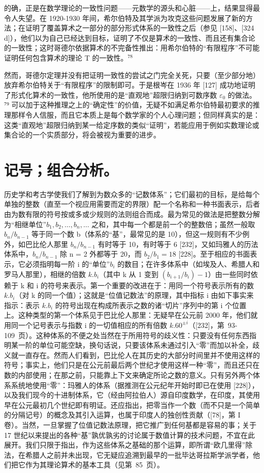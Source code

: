 的确，正是在数学理论的一致性问题——元数学的源头和心脏——上，结果显得最令人失望。在 1920-1930 年间，希尔伯特及其学派为攻克这些问题发展了新的方法；在证明了覆盖算术之一部分的部分形式体系的一致性之后（参见 {[}158{]}、{[}324 d{]}），他们以为自己已经达到目标，证明了不仅是算术的一致性、而且还有集合论的一致性；这时哥德尔依据算术的不完备性推出：用希尔伯特的“有限程序”不可能证明任何包含算术的理论 T 的一致性。\(^{78}\)

然而，哥德尔定理并没有把证明一致性的尝试之门完全关死，只要（至少部分地）放弃希尔伯特关于“有限程序”的限制即可。于是根岑在 1936 年 {[}127{]} 成功地证明了形式化算术的一致性，他所使用的是“直观地”超限归纳到可数序数 \(\varepsilon_{0}\) 的做法。⁷⁹ 可以加于这种推理之上的“确定性”的价值，无疑不如满足希尔伯特最初要求的推理那样令人信服，而且它本质上是每个数学家的个人心理问题；但同样真实的是：这类“直观地”超限归纳到某一给定序数的类似“证明”，若能应用于例如实数理论或集合论的一个实质部分，将会被视为重要的进步。

\chapter{记号；组合分析。}

历史学和考古学使我们了解到为数众多的“记数体系”；它们最初的目标，是给每个单独的整数（直至一个视应用需要而定的界限）配一个名称和一种书面表示，后者由为数有限的符号按或多或少规则的法则组合而成。最为常见的做法是把整数分解为“相继单位”\(b_{1}, b_{2}, \ldots, b_{n}, \ldots\) 之和，其中每一个都是前一个的整数倍；虽然一般取 \(b_{n}/b_{n-1}\) 等于同一个数 b（体系的“基”，最常见的是 10），但这一规则有不少例外，如巴比伦人那里 \(b_{n}/b_{n-1}\) 有时等于 10，有时等于 6 {[}232{]}，又如玛雅人的历法体系中，\(b_{n}/b_{n-1}\) 除 n = 2 外都等于 20，而 \(b_{2}/b_{1} = 18\) {[}228{]}。至于相应的书面表示，它必须指明每一阶 i 的“单位”\(b_{i}\) 的数目；在许多体系中（如埃及人、希腊人和罗马人那里），相继的倍数 \(k.b_{i}\)（其中 k 从 1 变到 \((b_{i+1}/b_{i}) - 1\)）由一些同时依赖于 k 和 i 的符号来表示。第一个重要的改进在于：用同一个符号表示所有的数 \(k.b_{i}\)（对 k 的同一个值）；这就是“位值记数法”的原理，其中指标 i 由如下事实来指示：表示 \(k.b_{i}\) 的符号出现在构成所表示之数的诸“切片”序列中的第 i 个位置上。这种类型的第一个体系见于巴比伦人那里：无疑早在公元前 2000 年，他们就用同一个记号表示与指数 i 的一切值相应的所有倍数 \(k.60^{\pm i}\)（{[}232{]}，第~93-109~页）。这种体系的不便之处当然在于所用符号的歧义性：只要没有任何东西指明某一阶的单位可能空缺，换句话说，只要该体系未通过引入“零”而加以补全，歧义就一直存在。然而人们看到，巴比伦人在其历史的大部分时间里并不使用这样的符号；事实上，他们只是在公元前最后两个世纪才使用这样一种“零”，而且还只在数的内部使用；在那之前，只能靠上下文来确定所论之数的意义。只有另外两个体系系统地使用“零”：玛雅人的体系（据推测在公元纪年开始时即已在使用 {[}228{]}），以及我们现今的十进制体系，它（经由阿拉伯人）源自印度数学，在印度，其使用早在公元最初几个世纪即有明证。还应指出，把零当作一个数（而不只是一个简单的分隔记号）的概念及其引入运算，也属于印度人的独创性贡献（{[}78{]}，第 I 卷）。当然，一旦掌握了位值记数法原理，把它推广到任何基都是容易的事；关于 17 世纪以来提出的各种“基”孰优孰劣的讨论属于数值计算的技术问题，不宜在此展开。我们只限于指出，作为这些体系之基础的那个运算，即所谓“欧几里得”除法，在希腊人之前并未出现，它无疑应追溯到最早的一批毕达哥拉斯学派学者，他们把它作为其理论算术的基本工具（见第~85~页）。

